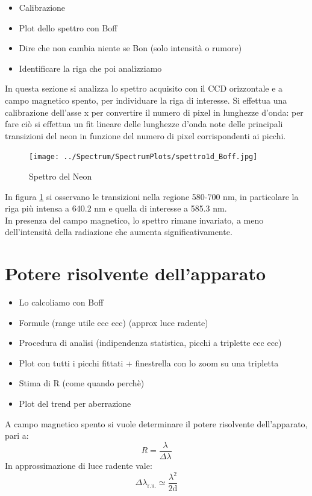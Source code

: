 \documentclass[twocolumn,10pt]{asme2ej}
\begin{document}
\begin{itemize}
    \item Calibrazione
    \item Plot dello spettro con Boff
    \item Dire che non cambia niente se Bon (solo intensità o rumore)
    \item Identificare la riga che poi analizziamo
\end{itemize}
In questa sezione si analizza lo spettro acquisito con il CCD orizzontale e a campo magnetico spento, per individuare la riga di interesse. 
Si effettua una calibrazione dell'asse x per convertire il numero di pixel in lunghezze d'onda: per fare ciò si effettua un fit lineare 
delle lunghezze d'onda note delle principali transizioni del neon in funzione del numero di pixel corrispondenti ai picchi. 
 
\begin{figure}
    \centering
    \texttt{[image: ../Spectrum/SpectrumPlots/spettro1d\_Boff.jpg]}
    \caption{Spettro del Neon}
    \label{i:spettro1d}
\end{figure}


In figura \ref{i:spettro1d} si osservano le transizioni nella regione 580-700 \si{\nano \metre}, in particolare la riga più intensa 
a 640.2 \si{\nano \metre} e quella di interesse a 585.3 \si{\nano \metre}.\\
In presenza del campo magnetico, lo spettro rimane invariato, a meno dell'intensità della radiazione che aumenta significativamente. 

\section{Potere risolvente dell'apparato}

\begin{itemize}
    \item Lo calcoliamo con Boff
    \item Formule (range utile ecc ecc) (approx luce radente) 
    \item Procedura di analisi (indipendenza statistica, picchi a triplette ecc ecc)
    \item Plot con tutti i picchi fittati + finestrella con lo zoom su una tripletta
    \item Stima di R (come quando perchè)
    \item Plot del trend per aberrazione 
\end{itemize}
A campo magnetico spento si vuole determinare il potere risolvente dell'apparato, pari a:
\begin{equation}
    R = \frac{\lambda}{\Delta \lambda}
\end{equation}
In approssimazione di luce radente vale:
\begin{equation}
    \Delta \lambda_{\text{r.u.}} \simeq \frac{\lambda^2}{2\text{d}}
    \label{e:lambdaru}
\end{equation}
\end{document}
